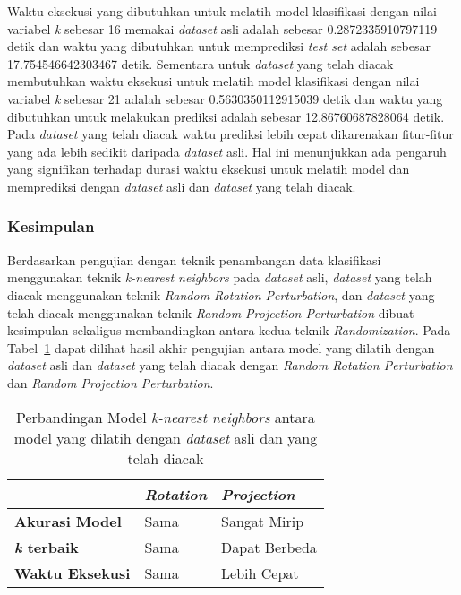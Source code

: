 Waktu eksekusi yang dibutuhkan untuk melatih model klasifikasi dengan nilai variabel \textit{k} sebesar 16 memakai \textit{dataset} asli adalah sebesar 0.2872335910797119 detik dan waktu yang dibutuhkan untuk memprediksi \textit{test set} adalah sebesar 17.754546642303467 detik. Sementara untuk \textit{dataset} yang telah diacak membutuhkan waktu eksekusi untuk melatih model klasifikasi dengan nilai variabel \textit{k} sebesar 21 adalah sebesar 0.5630350112915039 detik dan waktu yang dibutuhkan untuk melakukan prediksi adalah sebesar 12.86760687828064 detik. Pada \textit{dataset} yang telah diacak waktu prediksi lebih cepat dikarenakan fitur-fitur yang ada lebih sedikit daripada \textit{dataset} asli. Hal ini menunjukkan ada pengaruh yang signifikan terhadap durasi waktu eksekusi untuk melatih model dan memprediksi dengan \textit{dataset} asli dan \textit{dataset} yang telah diacak.

\subsubsection{Kesimpulan}
\label{subsubsec:pengujian-klasifikasi-kesimpulan}

Berdasarkan pengujian dengan teknik penambangan data klasifikasi menggunakan teknik \textit{k-nearest neighbors} pada \textit{dataset} asli, \textit{dataset} yang telah diacak menggunakan teknik \textit{Random Rotation Perturbation}, dan \textit{dataset} yang telah diacak menggunakan teknik \textit{Random Projection Perturbation} dibuat kesimpulan sekaligus membandingkan antara kedua teknik \textit{Randomization}. Pada Tabel~\ref{table:perbandingan-klasifikasi} dapat dilihat hasil akhir pengujian antara model yang dilatih dengan \textit{dataset} asli dan \textit{dataset} yang telah diacak dengan \textit{Random Rotation Perturbation} dan \textit{Random Projection Perturbation}.

\begin{table}
	\centering
	\caption{Perbandingan Model \textit{k-nearest neighbors} antara model yang dilatih dengan \textit{dataset} asli dan yang telah diacak}
	\begin{tabular}{|l|l|l|}
		\hline
		&\textbf{\textit{Rotation}}&\textbf{\textit{Projection}}\\ \hline
		\textbf{Akurasi Model}&Sama&Sangat Mirip\\
		\textbf{\textit{k} terbaik}&Sama&Dapat Berbeda\\
		\textbf{Waktu Eksekusi}&Sama&Lebih Cepat\\
		\hline
	\end{tabular}
	\label{table:perbandingan-klasifikasi}
\end{table}

